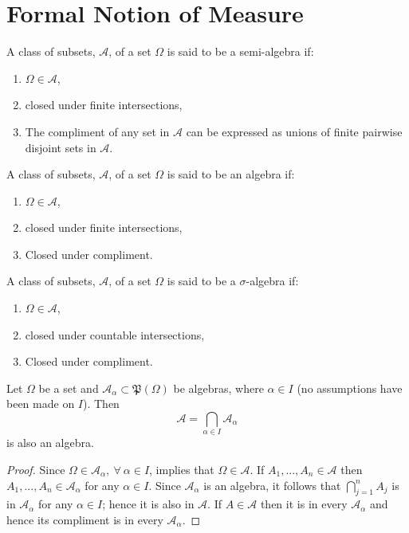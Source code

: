 \section{Formal Notion of Measure}
\begin{definition}
  A class of subsets, $\mathscr{A}$, of a set $\Omega$ is said to be a semi-algebra if:
  \begin{enumerate}
    \item $\Omega\in \mathscr{A}$,
    \item closed under finite intersections,
    \item The compliment of any set in $\mathscr{A}$ can be expressed as unions of finite pairwise disjoint sets in $\mathscr{A}$.
  \end{enumerate}
\end{definition}
\begin{definition}
  A class of subsets, $\mathscr{A}$, of a set $\Omega$ is said to be an algebra if:
  \begin{enumerate}
    \item $\Omega\in \mathscr{A}$,
    \item closed under finite intersections,
    \item Closed under compliment.
  \end{enumerate}
\end{definition}
\begin{definition}
  A class of subsets, $\mathscr{A}$, of a set $\Omega$ is said to be a $\sigma$-algebra if:
  \begin{enumerate}
    \item $\Omega\in \mathscr{A}$,
    \item closed under countable intersections,
    \item Closed under compliment.
  \end{enumerate}
\end{definition}
\begin{proposition}
  Let $\Omega$ be a set and $\mathscr{A}_\alpha\subset \mathfrak{P} (\Omega)$ be algebras, where $\alpha \in I$ (no assumptions have been made on $I$). Then
  \[\mathscr{A}= \bigcap_{\alpha\in I} \mathscr{A}_\alpha\]
  is also an algebra.
\end{proposition}
\begin{proof}
  Since $\Omega \in \mathscr{A}_\alpha,\ \forall\ \alpha\in I$, implies that $\Omega\in\mathscr{A}$. If $A_1,...,A_n \in \mathscr{A}$ then $A_1,...,A_n \in \mathscr{A}_\alpha$ for any $\alpha\in I$. Since $\mathscr{A}_\alpha$ is an algebra, it follows that $\bigcap_{j=1}^{n}A_j$ is in $\mathscr{A}_\alpha$ for any $\alpha\in I$; hence it is also in $\mathscr{A}$. If $A\in\mathscr{A}$ then it is in every $\mathscr{A}_\alpha$ and hence its compliment is in every $\mathscr{A}_\alpha$.  
\end{proof}
